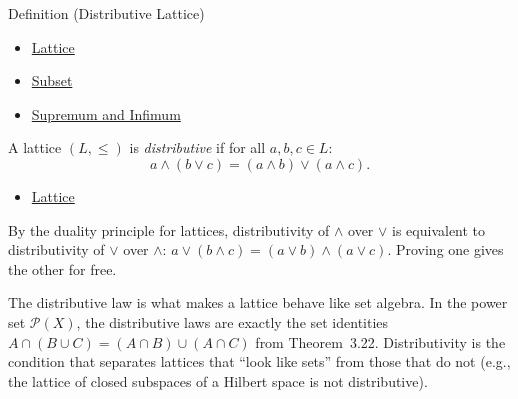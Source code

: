 \begin{definitionbox}{Definition (Distributive Lattice)}

\begin{dependencies}
\begin{itemize}
  \item \hyperref[def:lattice]{Lattice}
  \item \hyperref[def:subset]{Subset}
  \item \hyperref[def:sup-inf]{Supremum and Infimum}
\end{itemize}
\end{dependencies}
\begin{definition}\label{def:distributive-lattice}
A lattice $(L, \leq)$ is \emph{distributive} if for all $a, b, c \in L$:
\[
  a \wedge (b \vee c) = (a \wedge b) \vee (a \wedge c).
\]
\end{definition}
\end{definitionbox}

\begin{dependencies}
\begin{itemize}
  \item \hyperref[def:lattice]{Lattice}
\end{itemize}
\end{dependencies}

\begin{remark*}
\label{rem:dist-dual}
By the duality principle for lattices, distributivity of $\wedge$ over $\vee$
is equivalent to distributivity of $\vee$ over $\wedge$:
$a \vee (b \wedge c) = (a \vee b) \wedge (a \vee c)$.
Proving one gives the other for free.
\end{remark*}

\begin{remark*}
\label{rem:dist-matters}
The distributive law is what makes a lattice behave like set algebra.  In the
power set $\mathcal{P}(X)$, the distributive laws are exactly the set
identities $A \cap (B \cup C) = (A \cap B) \cup (A \cap C)$ from
Theorem~3.22.  Distributivity is the condition that separates lattices that
``look like sets'' from those that do not (e.g., the lattice of closed
subspaces of a Hilbert space is not distributive).
\end{remark*}


